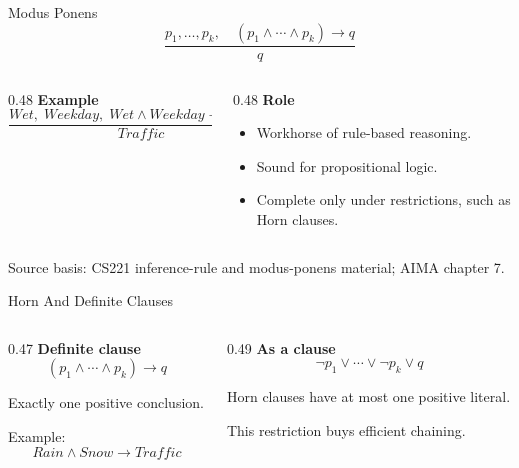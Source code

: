 \documentclass[aspectratio=169,11pt]{beamer}
\newcommand{\minihead}[1]{\textbf{\color{unswblue}#1}}
\newcommand{\source}[1]{\vfill{\scriptsize\color{darkgrey}Source basis: #1}}
\begin{document}
\begin{frame}{Modus Ponens}
  \small
  \[
    \frac{p_1,\ldots,p_k,\quad (p_1 \land \cdots \land p_k) \rightarrow q}{q}
  \]

  \begin{columns}[T,onlytextwidth]
    \begin{column}{0.48\textwidth}
      \minihead{Example}
      \[
        \frac{Wet,\; Weekday,\; Wet \land Weekday \rightarrow Traffic}{Traffic}
      \]
    \end{column}
    \begin{column}{0.48\textwidth}
      \minihead{Role}
      \begin{itemize}
        \item Workhorse of rule-based reasoning.
        \item Sound for propositional logic.
        \item Complete only under restrictions, such as Horn clauses.
      \end{itemize}
    \end{column}
  \end{columns}

  \source{CS221 inference-rule and modus-ponens material; AIMA chapter 7.}
\end{frame}

\begin{frame}{Horn And Definite Clauses}
  \begin{columns}[T,onlytextwidth]
    \begin{column}{0.47\textwidth}
      \minihead{Definite clause}
      \[
        (p_1 \land \cdots \land p_k) \rightarrow q
      \]

      Exactly one positive conclusion.

      \medskip
      Example:
      \[
        Rain \land Snow \rightarrow Traffic
      \]
    \end{column}
    \begin{column}{0.49\textwidth}
      \minihead{As a clause}
      \[
        \neg p_1 \lor \cdots \lor \neg p_k \lor q
      \]

      Horn clauses have at most one positive literal.

      \medskip
      This restriction buys efficient chaining.
    \end{column}
  \end{columns}
\end{frame}
\end{document}
